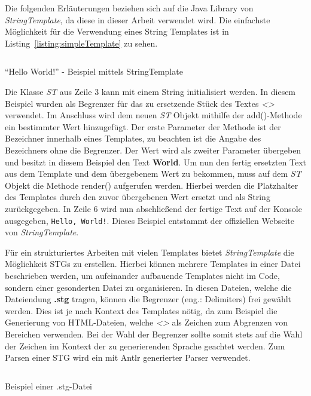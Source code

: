 Die folgenden Erläuterungen beziehen sich auf die Java Library von \textit{StringTemplate}, da diese in dieser Arbeit verwendet wird.
Die einfachste Möglichkeit für die Verwendung eines String Templates ist in Listing~\ref{listing:simpleTemplate} zu sehen.

\begin{listing}[!ht]
    \inputminted{java}{listings/2.2.1/JavaStringTemplateExample.java}
    \caption{``Hello World!'' - Beispiel mittels StringTemplate}
    \label{listing:simpleTemplate}
\end{listing}

Die Klasse \textit{ST} aus Zeile 3 kann mit einem String initialisiert werden.
In diesem Beispiel wurden als Begrenzer für das zu ersetzende Stück des Textes \textit{<>} verwendet.
Im Anschluss wird dem neuen \textit{ST} Objekt mithilfe der add()-Methode ein bestimmter Wert hinzugefügt.
Der erste Parameter der Methode ist der Bezeichner innerhalb eines Templates, zu beachten ist die Angabe des Bezeichners ohne die Begrenzer.
Der Wert wird als zweiter Parameter übergeben und besitzt in diesem Beispiel den Text \textbf{World}.
Um nun den fertig ersetzten Text aus dem Template und dem übergebenem Wert zu bekommen, muss auf dem \textit{ST} Objekt die Methode render() aufgerufen werden.
Hierbei werden die Platzhalter des Templates durch den zuvor übergebenen Wert ersetzt und als String zurückgegeben.
In Zeile 6 wird nun abschließend der fertige Text auf der Konsole ausgegeben, \texttt{Hello, World!}.
Dieses Beispiel entstammt der offiziellen Webseite von \textit{StringTemplate}.\cite*{stOrg}

Für ein strukturiertes Arbeiten mit vielen Templates bietet \textit{StringTemplate} die Möglichkeit \ac{STG}s zu erstellen.
Hierbei können mehrere Templates in einer Datei beschrieben werden, um aufeinander aufbauende Templates nicht im Code, sondern einer gesonderten Datei zu organisieren.
In diesen Dateien, welche die Dateiendung \textbf{.stg} tragen, können die Begrenzer (eng.: Delimiters) frei gewählt werden.
Dies ist je nach Kontext des Templates nötig, da zum Beispiel die Generierung von HTML-Dateien, welche \textit{<>} als Zeichen zum Abgrenzen von Bereichen verwenden.
Bei der Wahl der Begrenzer sollte somit stets auf die Wahl der Zeichen im Kontext der zu generierenden Sprache geachtet werden.
Zum Parsen einer \ac{STG} wird ein mit Antlr generierter Parser verwendet.\cite*{stgParser}

\begin{listing}[!ht]
    \inputminted{text}{listings/2.2.1/Example.stg}
    \caption{Beispiel einer .stg-Datei}
    \label{listing:stgFile}
\end{listing}


